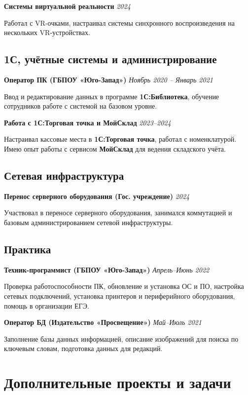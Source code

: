 \documentclass[10pt,a4paper]{article}
\newcommand{\projectEntry}[3]{\textbf{#1} \hfill \textit{#2}\par #3\par\vspace{0.3em}}
\begin{document}
\projectEntry{Системы виртуальной реальности}{2024}
{Работал с VR-очками, настраивал системы синхронного воспроизведения на нескольких VR-устройствах.}

\subsection{1С, учётные системы и администрирование}

\projectEntry{Оператор ПК (ГБПОУ «Юго-Запад»)}{Ноябрь 2020 – Январь 2021}
{Ввод и редактирование данных в программе \textbf{1С:Библиотека}, обучение сотрудников работе с системой на базовом уровне.}

\projectEntry{Работа с 1С:Торговая точка и МойСклад}{2023–2024}
{Настраивал кассовые места в \textbf{1С:Торговая точка}, работал с номенклатурой. Имею опыт работы с сервисом \textbf{МойСклад} для ведения складского учёта.}

\subsection{Сетевая инфраструктура}

\projectEntry{Перенос серверного оборудования (Гос. учреждение)}{2024}
{Участвовал в переносе серверного оборудования, занимался коммутацией и базовым администрированием сетевой инфраструктуры.}

\subsection{Практика}

\projectEntry{Техник-программист (ГБПОУ «Юго-Запад»)}{Апрель–Июнь 2022}
{Проверка работоспособности ПК, обновление и установка ОС и ПО, настройка сетевых подключений, установка принтеров и периферийного оборудования, помощь в организации ЕГЭ.}

\projectEntry{Оператор БД (Издательство «Просвещение»)}{Май–Июль 2021}
{Заполнение базы данных информацией, описание изображений для поиска по ключевым словам, подготовка данных для редакций.}

\section{Дополнительные проекты и задачи}
\end{document}
